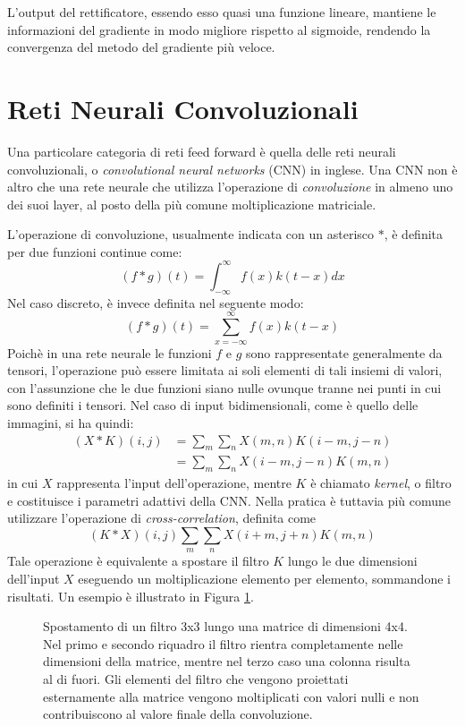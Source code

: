L'output del rettificatore, essendo esso quasi una funzione lineare, mantiene
le informazioni del gradiente in modo migliore rispetto al sigmoide,
rendendo la convergenza del metodo del gradiente più veloce.
\section{Reti Neurali Convoluzionali}
Una particolare categoria di reti feed forward è quella delle reti neurali
convoluzionali, o \emph{convolutional neural networks} (CNN) in inglese. Una
CNN non è altro che una rete neurale che utilizza l'operazione di
\emph{convoluzione} in almeno uno dei suoi layer, al posto della più comune
moltiplicazione matriciale.

L'operazione di convoluzione, usualmente indicata con un asterisco $*$, è
definita per due funzioni continue come:
$$
(f * g)(t) = \int_{-\infty}^\infty{f(x)k(t - x)dx}
$$
Nel caso discreto, è invece definita nel seguente modo:
$$
(f * g)(t) = \sum_{x = -\infty}^\infty{f(x)k(t - x)}
$$
Poichè in una rete neurale le funzioni $f$ e $g$ sono rappresentate
generalmente da tensori, l'operazione può essere limitata ai soli elementi di
tali insiemi di valori, con l'assunzione che le due funzioni siano nulle
ovunque tranne nei punti in cui sono definiti i tensori. Nel caso di input
bidimensionali, come è quello delle immagini, si ha quindi:
\begin{align*}
(X * K)(i,j) &= \sum_m{\sum_n{X(m,n) K(i - m, j - n)}} \\
             &= \sum_m{\sum_n{X(i - m, j - n) K(m, n)}}
\end{align*}
in cui $X$ rappresenta l'input dell'operazione, mentre $K$ è chiamato
\emph{kernel}, o filtro e costituisce i parametri adattivi della CNN. Nella
pratica è tuttavia più comune utilizzare l'operazione di
\emph{cross-correlation}, definita come
$$ (K * X)(i, j) \sum_m{\sum_n{X(i + m, j + n) K(m, n)}} $$
Tale operazione è equivalente a spostare il filtro $K$ lungo le due dimensioni
dell'input $X$ eseguendo un moltiplicazione elemento per elemento, sommandone i
risultati. Un esempio è illustrato in Figura \ref{fig:conv}.
\begin{figure}[!htp]
  \caption{ %
    Spostamento di un filtro 3x3 lungo una matrice di dimensioni 4x4. Nel
    primo e secondo riquadro il filtro rientra completamente nelle dimensioni
    della matrice, mentre nel terzo caso una colonna risulta al di fuori. Gli
    elementi del filtro che vengono proiettati esternamente alla matrice
    vengono moltiplicati con valori nulli e non contribuiscono al valore finale
    della convoluzione.
  }
  \label{fig:conv}
\end{figure}



